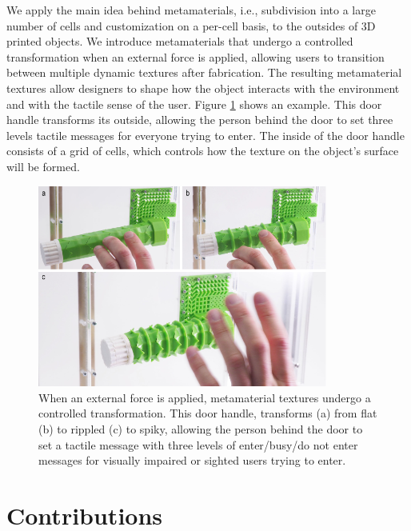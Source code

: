 We apply the main idea behind metamaterials, i.e., subdivision into a large number of cells and customization on a per-cell basis, to the outsides of 3D printed objects. We introduce metamaterials that undergo a controlled transformation when an external force is applied, allowing users to transition between multiple dynamic textures after fabrication. The resulting metamaterial textures allow designers to shape how the object interacts with the environment and with the tactile sense of the user. Figure \ref{fig:4-overview-textures} shows an example. This door handle transforms its outside, allowing the person behind the door to set three levels tactile messages for everyone trying to enter. The inside of the door handle consists of a grid of cells, which controls how the texture on the object's surface will be formed. 

\begin{figure} [h]
    \centering
    \includegraphics[width=0.85\textwidth]{chapters/introduction-FIG/4-overview-textures.pdf}
    \caption[Short figure name.]{When an external force is applied, metamaterial textures undergo a controlled transformation. This door handle, transforms (a) from flat (b) to rippled (c) to spiky, allowing the person behind the door to set a tactile message with three levels of enter/busy/do not enter messages for visually impaired or sighted users trying to enter.
    \label{fig:4-overview-textures}}
\end{figure}



\section{Contributions}

